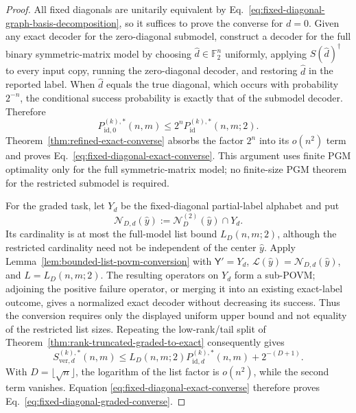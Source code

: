 \documentclass[11pt]{article}
\newcommand{\F}{\mathbb F}
\newcommand{\1}{\mathbf 1}
\theoremstyle{plain}
\theoremstyle{definition}
\theoremstyle{remark}
\begin{document}
\begin{proof}
All fixed diagonals are unitarily equivalent by
Eq.~\eqref{eq:fixed-diagonal-graph-basis-decomposition}, so it suffices to
prove the converse for $d=0$.  Given any exact decoder for the zero-diagonal
submodel, construct a decoder for the full binary symmetric-matrix model by
choosing $\widehat d\in\F_2^n$ uniformly, applying
$S(\widehat d)^\dagger$ to every input copy, running the zero-diagonal decoder,
and restoring $\widehat d$ in the reported label.  When $\widehat d$ equals
the true diagonal, which occurs with probability $2^{-n}$, the conditional
success probability is exactly that of the submodel decoder.  Therefore
\begin{equation}
 P_{\mathrm{id},0}^{(k),*}(n,m)
 \le 2^n P_{\mathrm{id}}^{(k),*}(n,m;2).
 \label{eq:fixed-diagonal-decoder-comparison}
\end{equation}
Theorem~\ref{thm:refined-exact-converse} absorbs the factor $2^n$ into its
$o(n^2)$ term and proves Eq.~\eqref{eq:fixed-diagonal-exact-converse}.  This
argument uses finite PGM optimality only for the full symmetric-matrix model;
no finite-size PGM theorem for the restricted submodel is required.

For the graded task, let $Y_d$ be the fixed-diagonal partial-label alphabet and
put
\begin{equation}
 \mathcal N_{D,d}(\widehat y)
 :=\mathcal N_D^{(2)}(\widehat y)\cap Y_d.
 \label{eq:fixed-diagonal-restricted-neighborhood}
\end{equation}
Its cardinality is at most the full-model list bound $L_D(n,m;2)$, although
the restricted cardinality need not be independent of the center
$\widehat y$.  Apply Lemma~\ref{lem:bounded-list-povm-conversion} with
$\mathsf Y'=Y_d$, $\mathcal L(\widehat y)=\mathcal N_{D,d}(\widehat y)$, and
$L=L_D(n,m;2)$.  The resulting operators on $Y_d$ form a sub-POVM; adjoining
the positive failure operator, or merging it into an existing exact-label
outcome, gives a normalized exact decoder without decreasing its success.
Thus the conversion requires only the displayed uniform upper bound and not
equality of the restricted list sizes.  Repeating the low-rank/tail split of
Theorem~\ref{thm:rank-truncated-graded-to-exact} consequently gives
\begin{equation}
 S_{\mathrm{ver},d}^{(k),*}(n,m)
 \le L_D(n,m;2)P_{\mathrm{id},d}^{(k),*}(n,m)+2^{-(D+1)}.
 \label{eq:fixed-diagonal-graded-list-bound}
\end{equation}
With $D=\lfloor\sqrt n\rfloor$, the logarithm of the list factor is $o(n^2)$,
while the second term vanishes.  Equation
\eqref{eq:fixed-diagonal-exact-converse} therefore proves
Eq.~\eqref{eq:fixed-diagonal-graded-converse}.


\end{proof}
\end{document}
